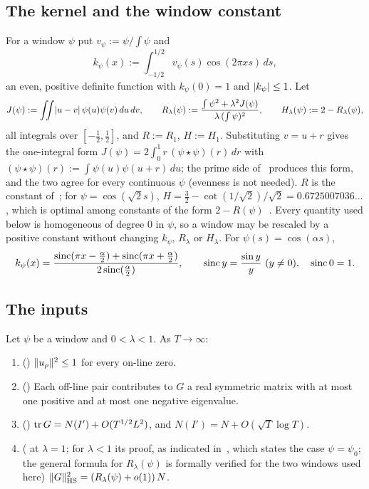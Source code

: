 \subsection{The kernel and the window constant}\label{ssec:kernel}
For a window $\psi$ put $v_\psi:=\psi/\!\int\psi$ and
\[
k_\psi(x):=\int_{-1/2}^{1/2}v_\psi(s)\cos(2\pi xs)\,ds ,
\]
an even, positive definite function with $k_\psi(0)=1$ and $\lvert k_\psi\rvert\le1$. Let
\[
J(\psi):=\iint\lvert u-v\rvert\,\psi(u)\psi(v)\,du\,dv,\qquad R_\lambda(\psi):=\frac{\int\psi^2+\lambda^2J(\psi)}{\lambda\,(\int\psi)^2},\qquad
H_\lambda(\psi):=2-R_\lambda(\psi),
\]
all integrals over $[-\frac12,\frac12]$, and $R:=R_1$, $H:=H_1$. Substituting $v=u+r$ gives the one-integral form
$J(\psi)=2\int_0^1r\,(\psi\star\psi)(r)\,dr$ with $(\psi\star\psi)(r):=\int\psi(u)\psi(u+r)\,du$; the prime side of~\cite{AF} produces this form,
and the two agree for every continuous $\psi$ (evenness is not needed). $R$ is the constant of~\cite[Lemma~5.6]{AF}; for $\psi=\cos(\sqrt2s)$,
$H=\frac32-\cot(1/\sqrt2)/\sqrt2=0.6725007036\ldots$, which is optimal among constants of the form $2-R(\psi)$~\cite{CCLM}. Every quantity
used below is homogeneous of degree $0$ in $\psi$, so a window may be rescaled by a positive constant without changing $k_\psi$, $R_\lambda$
or $H_\lambda$. For $\psi(s)=\cos(\alpha s)$,
\begin{equation}\label{eq:kcos}
k_\psi(x)=\frac{\sinc(\pi x-\frac\alpha2)+\sinc(\pi x+\frac\alpha2)}{2\sinc(\frac\alpha2)},\qquad\sinc y=\frac{\sin y}y\ (y\ne0),\quad\sinc0=1 .
\end{equation}

\subsection{The inputs}\label{ssec:inputs}
\begin{proposition}\label{prop:AF}
Let $\psi$ be a window and $0<\lambda<1$. As $T\to\infty$:
\begin{enumerate}[label=\textup{(AF\arabic*)}]
\item \textup{(\cite[Lemma~2.1]{AF})} $\lVert u_\rho\rVert^2\le1$ for every on-line zero.
\item \textup{(\cite[Lemma~3.1 and Proposition~4.1]{AF})} Each off-line pair contributes to $G$ a real symmetric matrix with at most one
positive and at most one negative eigenvalue.
\item \textup{(\cite[Proposition~4.2]{AF})} $\operatorname{tr} G=N(I')+O(T^{1/2}L^2)$, and $N(I')=N+O(\sqrt T\log T)$.
\item \textup{(\cite[Theorem~5.7]{AF} at $\lambda=1$; for $\lambda<1$ its proof, as indicated in~\cite[Remark~6.1]{AF}, which states the case
$\psi=\psi_0$; the general formula for $R_\lambda(\psi)$ is formally verified for the two windows used here)} $\lVert G\rVert_{\mathrm{HS}}^2=(R_\lambda(\psi)+o(1))\,N$.
\end{enumerate}
\end{proposition}

